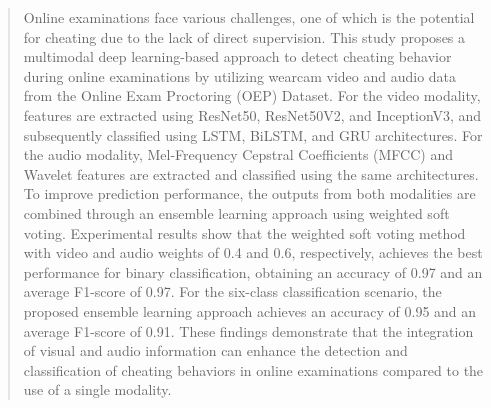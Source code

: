 \documentclass {rapidsart}
\theoremstyle{plain}
\theoremstyle{remark}
\theoremstyle{definition}
\begin{document}
\begin{frontmatter}
\begin{kunciwords} %
\end{kunciwords}

\begin{abstract}
    Online examinations face various challenges, one of which is the potential for cheating due to the lack of direct supervision. This study proposes a multimodal deep learning-based approach to detect cheating behavior during online examinations by utilizing wearcam video and audio data from the Online Exam Proctoring (OEP) Dataset. For the video modality, features are extracted using ResNet50, ResNet50V2, and InceptionV3, and subsequently classified using LSTM, BiLSTM, and GRU architectures. For the audio modality, Mel-Frequency Cepstral Coefficients (MFCC) and Wavelet features are extracted and classified using the same architectures. To improve prediction performance, the outputs from both modalities are combined through an ensemble learning approach using weighted soft voting. Experimental results show that the weighted soft voting method with video and audio weights of 0.4 and 0.6, respectively, achieves the best performance for binary classification, obtaining an accuracy of 0.97 and an average F1-score of 0.97. For the six-class classification scenario, the proposed ensemble learning approach achieves an accuracy of 0.95 and an average F1-score of 0.91. These findings demonstrate that the integration of visual and audio information can enhance the detection and classification of cheating behaviors in online examinations compared to the use of a single modality.
\end{abstract}

\begin{keywords} %
\end{keywords}


\received{\today}
\revised{\today}
\accepted{\today}

\end{frontmatter}
\end{document}
